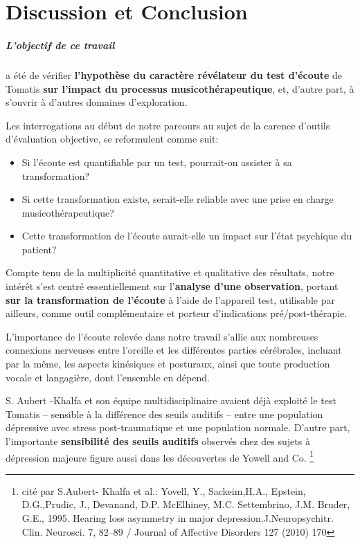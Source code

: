 
\chapter{Discussion et Conclusion}
\label{Conclusions}


\paragraph{L'objectif de ce travail} a été de vérifier\textbf{ l'hypothèse du caractère
révélateur du test
d'écoute }de Tomatis \textbf{ sur l'impact du processus musicothérapeutique},
et, d'autre part, à s'ouvrir à d'autres
domaines d'exploration.

Les interrogations au début de notre parcours au
sujet de la carence d'outils d'évaluation objective, se
reformulent comme suit:
\begin{itemize}
     \item
       Si l'écoute est quantifiable  par un test, pourrait-on assister à sa
transformation?
\item Si cette transformation existe, serait-elle reliable avec
une prise en charge musicothérapeutique?
\item Cette transformation de l'écoute aurait-elle un impact sur l'état
psychique du patient? %
\end{itemize}



  Compte tenu de la multiplicité quantitative et qualitative des
  résultats, notre intérêt s'est centré essentiellement sur l'\textbf{analyse d'une
  observation}, portant \textbf{sur la transformation de l'écoute} à l'aide de
  l'appareil test, utilisable par ailleurs, comme outil complémentaire
  et porteur d'indications pré/post-thérapie.




L'importance de l'écoute relevée dans notre travail
s'allie aux nombreuses connexions nerveuses entre l'oreille et les
différentes parties cérébrales, incluant par la même, les aspects kinésiques
et posturaux, ainsi que toute production vocale et langagière,
dont l'ensemble en dépend.



S. Aubert -Khalfa et son équipe multidisciplinaire \autocite{affectiveDisorders} avaient déjà
exploité le test Tomatis -- sensible à la différence des
seuils auditifs -- entre une population
dépressive avec stress post-traumatique et une population normale.
D'autre part, l'importante\textbf{ sensibilité des seuils auditifs }observés chez des
sujets à dépression majeure figure aussi dans les découvertes de Yowell and Co.
\autocite{affectiveDisorders}\footnote{cité
par S.Aubert- Khalfa et al.: Yovell, Y.,
  Sackeim,H.A., Epstein, D.G.,Prudic, J., Devanand, D.P. McElhiney,
  M.C. Settembrino, J.M. Bruder, G.E., 1995. Hearing loss asymmetry in
  major depression.J.Neuropsychitr. Clin. Neurosci. 7, 82--89 / Journal of Affective Disorders 127
  (2010) 170}


